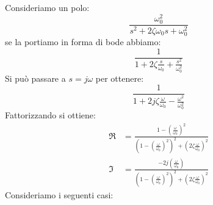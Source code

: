 \documentclass[a4paper]{article}
\begin{document}
\vspace{1em}
\noindent
Consideriamo un polo:
\[
\frac{\omega_0^2}{s^2 + 2 \zeta \omega_0s + \omega_0^2}
\] 
se la portiamo in forma di bode abbiamo:
\[
\frac{1}{
  1 + 2 \zeta \frac{s}{\omega_0} + \frac{s^2}{\omega_0^2}
}
\] 
Si può passare a \( s = j \omega \) per ottenere:
\[
\frac{1}{
  1 + 2 j \zeta \frac{\omega}{\omega_0} - \frac{\omega^2}{\omega_0^2}
}
\] 
Fattorizzando si ottiene:
\[
  \begin{aligned}
    \Re &= \frac{1 - \left( \frac{\omega}{\omega_0} \right)^2 }{
      \left( 1 - \left( \frac{\omega}{\omega_0} \right) ^2 \right) ^2 + \left( 2 \zeta \frac{\omega}{\omega_0} \right) ^2
    }\\
    \Im &= \frac{-2j \left( \frac{\omega}{\omega_0} \right) }{
      \left( 1 - \left( \frac{\omega}{\omega_0} \right) ^2 \right) ^2 
      + \left( 2 \zeta \frac{\omega}{\omega_0} \right) ^2
    }
  \end{aligned}
\] 
Consideriamo i seguenti casi:
\end{document}
